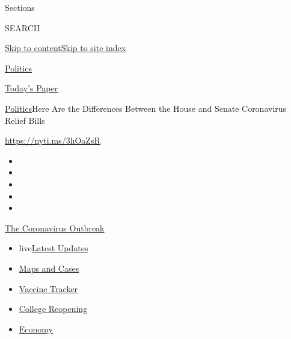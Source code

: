 Sections

SEARCH

\protect\hyperlink{site-content}{Skip to
content}\protect\hyperlink{site-index}{Skip to site index}

\href{https://www.nytimes.com/section/politics}{Politics}

\href{https://myaccount.nytimes.com/auth/login?response_type=cookie\&client_id=vi}{}

\href{https://www.nytimes.com/section/todayspaper}{Today's Paper}

\href{/section/politics}{Politics}\textbar{}Here Are the Differences
Between the House and Senate Coronavirus Relief Bills

\url{https://nyti.ms/3hOaZsR}

\begin{itemize}
\item
\item
\item
\item
\item
\end{itemize}

\href{https://www.nytimes.com/news-event/coronavirus?action=click\&pgtype=Article\&state=default\&region=TOP_BANNER\&context=storylines_menu}{The
Coronavirus Outbreak}

\begin{itemize}
\tightlist
\item
  live\href{https://www.nytimes.com/2020/08/04/world/coronavirus-cases.html?action=click\&pgtype=Article\&state=default\&region=TOP_BANNER\&context=storylines_menu}{Latest
  Updates}
\item
  \href{https://www.nytimes.com/interactive/2020/us/coronavirus-us-cases.html?action=click\&pgtype=Article\&state=default\&region=TOP_BANNER\&context=storylines_menu}{Maps
  and Cases}
\item
  \href{https://www.nytimes.com/interactive/2020/science/coronavirus-vaccine-tracker.html?action=click\&pgtype=Article\&state=default\&region=TOP_BANNER\&context=storylines_menu}{Vaccine
  Tracker}
\item
  \href{https://www.nytimes.com/2020/08/02/us/covid-college-reopening.html?action=click\&pgtype=Article\&state=default\&region=TOP_BANNER\&context=storylines_menu}{College
  Reopening}
\item
  \href{https://www.nytimes.com/live/2020/08/04/business/stock-market-today-coronavirus?action=click\&pgtype=Article\&state=default\&region=TOP_BANNER\&context=storylines_menu}{Economy}
\end{itemize}


